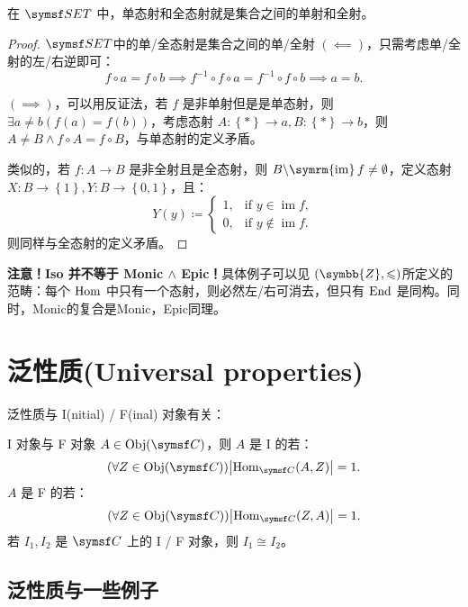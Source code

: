 在 \(\SET\) 中，单态射和全态射就是集合之间的单射和全射。

\begin{proof}{\(\SET\)中的单/全态射是集合之间的单/全射}
    \((\impliedby) \)，只需考虑单/全射的左/右逆即可：
    \[
        f\circ a=f\circ b\implies f^{-1} \circ f\circ a=f^{-1} \circ f\circ b\implies a=b
        .\]

    \((\implies)\)，可以用反证法，若 \(f\) 是非单射但是是单态射，则 \(\exists a\neq b(f(a)=f(b))\)，考虑态射 \(A:\left\{ * \right\} \to a,B:\left\{ * \right\} \to b\)，则 \( A \neq B\land f\circ A = f\circ B\)，与单态射的定义矛盾。

    类似的，若 \(f:A\to B\) 是非全射且是全态射，则 \(B\backslash {\operatorname{\symrm{im}}f}\neq \emptyset\)，定义态射 \(X: B\to \left\{ 1 \right\} ,Y:B\to \left\{ 0,1 \right\}\)，且：
    \[
        Y(y)\coloneqq \begin{cases}
            1,  & \text{if }y\in \operatorname{im}f ,   \\
            0 , & \text{if }y \notin\operatorname{im}f.
        \end{cases}
    \]
    则同样与全态射的定义矛盾。
\end{proof}

\textbf{注意！Iso 并不等于 Monic \(\land\) Epic！}具体例子可以见 \((\symbb{Z} ,\leqslant )\)所定义的范畴：每个 \(\operatorname{Hom}\) 中只有一个态射，则必然左/右可消去，但只有 \(\operatorname{End}\) 是同构。同时，Monic的复合是Monic，Epic同理。


\section{泛性质(Universal properties)}

泛性质与 I(nitial) / F(inal) 对象有关：

\begin{defi}{I 对象与 F 对象}
    \(A\in\Obj\left( \symsf C \right) \)，则 \(A\) 是 I 的若：
    \[
        (\forall Z\in\Obj(\symsf C))\left\vert \Hom_{\symsf C}(A,Z) \right\vert =1
        .\]
    \(A\) 是 F 的若：
    \[
        (\forall Z\in\Obj(\symsf C))\left\vert \Hom_{\symsf C}(Z,A) \right\vert =1
        .\]
    若 \(I_1,I_2\) 是 \(\symsf C\) 上的 I / F 对象，则 \(I_1\cong I_2\)。
\end{defi}


\subsection{泛性质与一些例子}

